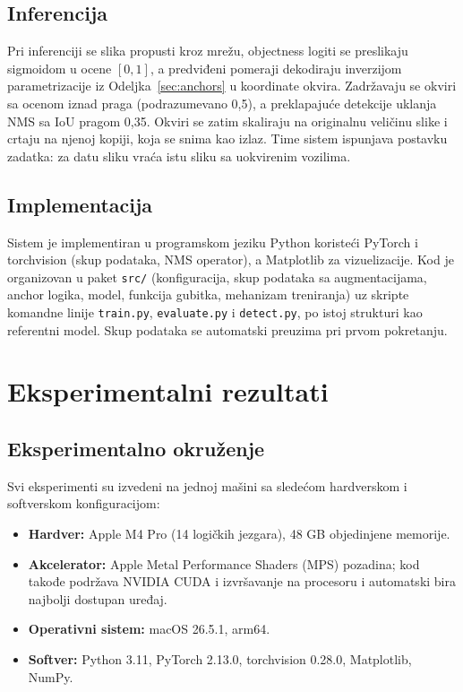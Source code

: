 \documentclass[11pt,a4paper]{article}
\begin{document}
\subsection{Inferencija}

Pri inferenciji se slika propusti kroz mrežu, objectness logiti se
preslikaju sigmoidom u ocene $[0,1]$, a predviđeni pomeraji dekodiraju
inverzijom parametrizacije iz Odeljka~\ref{sec:anchors} u koordinate okvira.
Zadržavaju se okviri sa ocenom iznad praga (podrazumevano 0,5), a preklapajuće
detekcije uklanja NMS sa IoU pragom 0,35. Okviri se zatim skaliraju na
originalnu veličinu slike i crtaju na njenoj kopiji, koja se snima kao
izlaz. Time sistem ispunjava postavku zadatka: za datu sliku vraća istu
sliku sa uokvirenim vozilima.

\subsection{Implementacija}

Sistem je implementiran u programskom jeziku Python koristeći PyTorch i
torchvision (skup podataka, NMS operator), a Matplotlib za vizuelizacije.
Kod je organizovan u paket \texttt{src/} (konfiguracija, skup podataka sa
augmentacijama, anchor logika, model, funkcija gubitka, mehanizam treniranja)
uz skripte komandne linije \texttt{train.py}, \texttt{evaluate.py} i
\texttt{detect.py}, po istoj strukturi kao referentni model. Skup podataka se
automatski preuzima pri prvom pokretanju.

\section{Eksperimentalni rezultati}
\label{sec:results}

\subsection{Eksperimentalno okruženje}

Svi eksperimenti su izvedeni na jednoj mašini sa sledećom hardverskom i
softverskom konfiguracijom:

\begin{itemize}
\item \textbf{Hardver:} Apple M4 Pro (14 logičkih jezgara), 48 GB objedinjene
memorije.
\item \textbf{Akcelerator:} Apple Metal Performance Shaders (MPS) pozadina; kod
takođe podržava NVIDIA CUDA i izvršavanje na procesoru i automatski bira
najbolji dostupan uređaj.
\item \textbf{Operativni sistem:} macOS 26.5.1, arm64.
\item \textbf{Softver:} Python 3.11, PyTorch 2.13.0, torchvision 0.28.0,
Matplotlib, NumPy.
\end{itemize}
\end{document}
